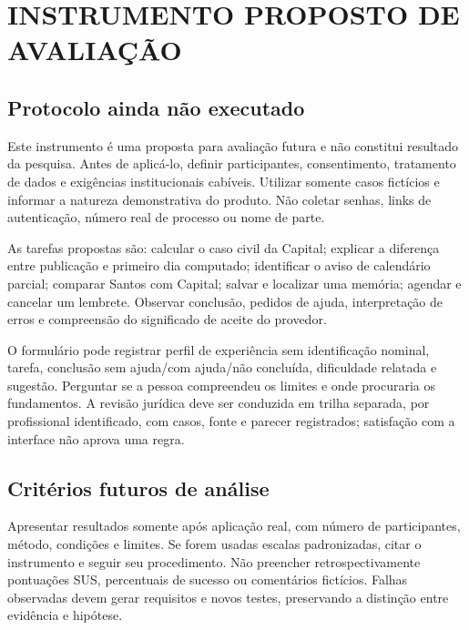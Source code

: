 \chapter{INSTRUMENTO PROPOSTO DE AVALIAÇÃO}
\label{chapter-E}
\section{Protocolo ainda não executado}
\label{section-E-1}
Este instrumento é uma proposta para avaliação futura e não constitui resultado da pesquisa. Antes de aplicá-lo, definir participantes, consentimento, tratamento de dados e exigências institucionais cabíveis. Utilizar somente casos fictícios e informar a natureza demonstrativa do produto. Não coletar senhas, links de autenticação, número real de processo ou nome de parte.

As tarefas propostas são: calcular o caso civil da Capital; explicar a diferença entre publicação e primeiro dia computado; identificar o aviso de calendário parcial; comparar Santos com Capital; salvar e localizar uma memória; agendar e cancelar um lembrete. Observar conclusão, pedidos de ajuda, interpretação de erros e compreensão do significado de aceite do provedor.

O formulário pode registrar perfil de experiência sem identificação nominal, tarefa, conclusão sem ajuda/com ajuda/não concluída, dificuldade relatada e sugestão. Perguntar se a pessoa compreendeu os limites e onde procuraria os fundamentos. A revisão jurídica deve ser conduzida em trilha separada, por profissional identificado, com casos, fonte e parecer registrados; satisfação com a interface não aprova uma regra.

\section{Critérios futuros de análise}
\label{section-E-2}
Apresentar resultados somente após aplicação real, com número de participantes, método, condições e limites. Se forem usadas escalas padronizadas, citar o instrumento e seguir seu procedimento. Não preencher retrospectivamente pontuações SUS, percentuais de sucesso ou comentários fictícios. Falhas observadas devem gerar requisitos e novos testes, preservando a distinção entre evidência e hipótese.
